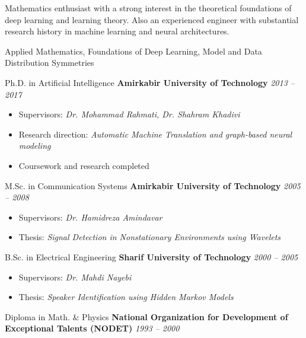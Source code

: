 \documentclass[11pt, a4paper]{awesome-cv}
\begin{document}
\makecvheader
\newcommand{\cvevent}[3]{#1 \textbf{#2} \textit{#3}}


Mathematics enthusiast with a strong interest in the theoretical foundations of
deep learning and learning theory. Also an experienced engineer with
substantial research history in machine learning and neural architectures.


Applied Mathematics, Foundations of Deep Learning, Model and Data Distribution
Symmetries


\cvevent
{Ph.D. in Artificial Intelligence}
{Amirkabir University of Technology}
{2013 -- 2017}
{}
{
  \begin{itemize}
    \item Supervisors: \textit{Dr. Mohammad Rahmati, Dr. Shahram Khadivi}
    \item Research direction: \textit{Automatic Machine Translation and graph-based
            neural modeling}
    \item Coursework and research completed
  \end{itemize}
}

\cvevent
{M.Sc. in Communication Systems}
{Amirkabir University of Technology}
{2005 -- 2008}
{}
{
  \begin{itemize}
    \item Supervisors: \textit{Dr. Hamidreza Amindavar}
    \item Thesis: \textit{Signal Detection in Nonstationary Environments using Wavelets}
  \end{itemize}
}

\cvevent
{B.Sc. in Electrical Engineering}
{Sharif University of Technology}
{2000 -- 2005}
{}
{
  \begin{itemize}
    \item Supervisors: \textit{Dr. Mahdi Nayebi}
    \item Thesis: \textit{Speaker Identification using Hidden Markov Models}
  \end{itemize}
}

\cvevent
{Diploma in Math. \& Physics}
{{\small National Organization for Development of Exceptional Talents} (NODET)}
{1993 -- 2000}
{}
{}
\end{document}
